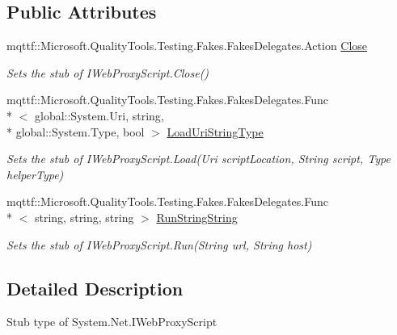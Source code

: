 \subsection*{Public Attributes}
\begin{DoxyCompactItemize}
\item 
mqttf\-::\-Microsoft.\-Quality\-Tools.\-Testing.\-Fakes.\-Fakes\-Delegates.\-Action \hyperlink{class_system_1_1_net_1_1_fakes_1_1_stub_i_web_proxy_script_a8efe9e8a738856ec2b653663d249a1e6}{Close}
\begin{DoxyCompactList}\small\item\em Sets the stub of I\-Web\-Proxy\-Script.\-Close()\end{DoxyCompactList}\item 
mqttf\-::\-Microsoft.\-Quality\-Tools.\-Testing.\-Fakes.\-Fakes\-Delegates.\-Func\\*
$<$ global\-::\-System.\-Uri, string, \\*
global\-::\-System.\-Type, bool $>$ \hyperlink{class_system_1_1_net_1_1_fakes_1_1_stub_i_web_proxy_script_a7223581339abe1dec30faee6dd8208ec}{Load\-Uri\-String\-Type}
\begin{DoxyCompactList}\small\item\em Sets the stub of I\-Web\-Proxy\-Script.\-Load(\-Uri script\-Location, String script, Type helper\-Type)\end{DoxyCompactList}\item 
mqttf\-::\-Microsoft.\-Quality\-Tools.\-Testing.\-Fakes.\-Fakes\-Delegates.\-Func\\*
$<$ string, string, string $>$ \hyperlink{class_system_1_1_net_1_1_fakes_1_1_stub_i_web_proxy_script_aa947d6fe05afd080240d2bc1bef7bc66}{Run\-String\-String}
\begin{DoxyCompactList}\small\item\em Sets the stub of I\-Web\-Proxy\-Script.\-Run(\-String url, String host)\end{DoxyCompactList}\end{DoxyCompactItemize}


\subsection{Detailed Description}
Stub type of System.\-Net.\-I\-Web\-Proxy\-Script



